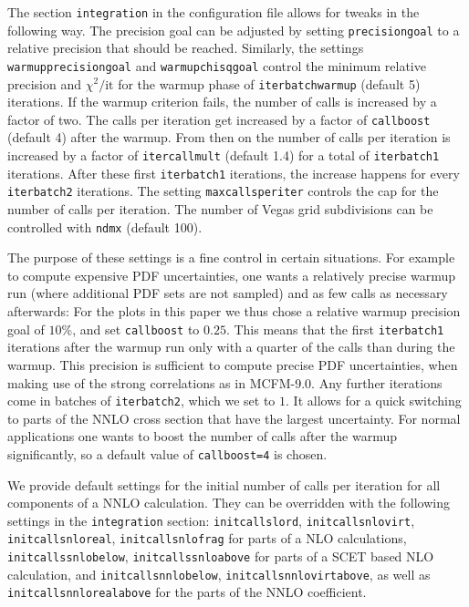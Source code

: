 The section \texttt{integration} in the configuration file allows for tweaks in the following way. The precision
goal can be adjusted by setting \texttt{precisiongoal} to a relative precision that should be reached. Similarly,
the settings \texttt{warmupprecisiongoal} and \texttt{warmupchisqgoal} control the minimum relative precision and
$\chi^2/\text{it}$ for the warmup phase of \texttt{iterbatchwarmup} (default 5) iterations. If the warmup criterion
fails, the number of calls is increased by a factor of two. The calls per iteration get increased by a factor of 
\texttt{callboost} (default 4) after the warmup. From then on the number of calls per iteration is 
increased by a factor of \texttt{itercallmult} (default 1.4) for a total of \texttt{iterbatch1} iterations. After these 
first \texttt{iterbatch1} iterations, the increase happens for every \texttt{iterbatch2} iterations. The setting 
\texttt{maxcallsperiter} controls the cap for the number of calls per iteration. The 
number of Vegas grid subdivisions can be controlled with \texttt{ndmx} (default 100).

The purpose of these settings is a fine control in certain situations. For example to compute expensive PDF 
uncertainties, one wants a relatively precise warmup run (where additional PDF sets are not sampled) and as few 
calls as necessary afterwards: For the plots in this paper we thus chose a relative warmup precision goal of $10\%$, 
and set \texttt{callboost} to $0.25$. This means that the first \texttt{iterbatch1} iterations after the warmup run 
only 
with a quarter of the calls than during the warmup. This precision is sufficient to compute precise PDF 
uncertainties, when making use of the strong correlations as in MCFM-9.0. Any further iterations come in batches of 
\texttt{iterbatch2}, which we set to $1$. It allows for a quick switching to parts of the NNLO cross section that 
have the largest uncertainty. For normal applications one wants to boost the number of calls after the warmup 
significantly, so a default value of \texttt{callboost=4} is chosen.

We provide default settings for the initial number of calls per iteration for all components of a NNLO calculation. 
They can be overridden with the following settings in the \texttt{integration} section: \texttt{initcallslord}, 
\texttt{initcallsnlovirt}, \texttt{initcallsnloreal}, \texttt{initcallsnlofrag} for parts of a NLO calculations,
\texttt{initcallssnlobelow}, \texttt{initcallssnloabove} for parts of a SCET based NLO calculation, and 
\texttt{initcallsnnlobelow}, \texttt{initcallsnnlovirtabove}, as well as \texttt{initcallsnnlorealabove} for the parts 
of the NNLO coefficient.

